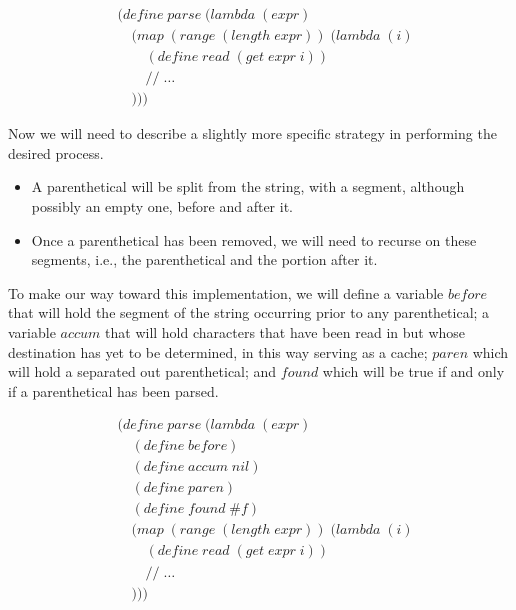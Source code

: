 \begin{figure}[htp]
\footnotesize
\caption{}\label{fig:loopParse}
\begin{align*}
& (define \; parse \; (lambda \; (expr) \; 
\\& \quad (map \; (range \; (length \; expr)) \; (lambda \; (i)
\\& \qquad (define \; read \; (get \; expr \; i))
\\& \qquad // \; \dots
\\& \quad )))
\end{align*}
\end{figure}

Now we will need to describe a slightly more specific strategy in performing the desired 
process.

\begin{itemize}
  \item A parenthetical will be split from the string, with a segment, although possibly an empty one, before and after it.
  \item Once a parenthetical has been removed, we will need to recurse on these segments, i.e., the parenthetical and the portion after it.
\end{itemize}

To make our way toward this implementation, we will define a variable $before$ that will 
hold the segment of the string occurring prior to any parenthetical; a variable $accum$ 
that will hold characters that have been read in but whose destination has yet to be 
determined, in this way serving as a cache; $paren$ which will hold a separated out 
parenthetical; and $found$ which will be true if and only if a parenthetical has been 
parsed.

\begin{figure}[htp]
\footnotesize
\caption{}\label{fig:definsPrelude}
\begin{align*}
& (define \; parse \; (lambda \; (expr) \; 
\\& \quad (define \; before)
\\& \quad (define \; accum \; nil)
\\& \quad (define \; paren)
\\& \quad (define \; found \; \#f)
\\& \quad (map \; (range \; (length \; expr)) \; (lambda \; (i)
\\& \qquad (define \; read \; (get \; expr \; i))
\\& \qquad // \; \dots
\\& \quad )))
\end{align*}
\end{figure}

